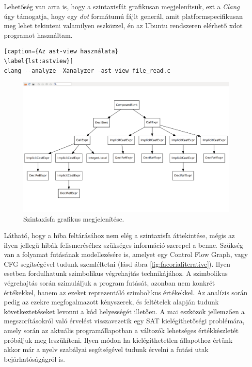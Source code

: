 \documentclass[a4paper,12pt]{report}
\begin{document}
Lehetőség van arra is, hogy a szintaxisfát grafikusan megjelenítsük, ezt a \emph{Clang} úgy támogatja, hogy egy \emph{dot} formátumú fájlt generál, amit platformspecifikusan meg lehet tekinteni valamilyen eszközzel, én az Ubuntu rendszeren elérhető xdot programot használtam.
\begin{lstlisting}[caption={Az ast-view használata}
\label{lst:astview}]
clang --analyze -Xanalyzer -ast-view file_read.c
\end{lstlisting}

\begin{figure}[h]
\caption{Szintaxisfa grafikus megjelenítése.}
\centering
\includegraphics[scale=0.2]{astview.png}
\end{figure}

Látható, hogy a hiba feltárásához nem elég a szintaxisfa áttekintése, mégis az ilyen jellegű hibák felismeréséhez szükséges információ szerepel a benne. Szükség van a folyamat futásának modellezésére is, amelyet egy Control Flow Graph, vagy CFG segítségével tudunk szemléltetni (lásd ábra \ref{fig:facorialiterative}). Ilyen esetben fordulhatunk szimbolikus végrehajtás technikájához. A szimbolikus végrehajtás során szimuláljuk a program futását, azonban nem konkrét értékekkel, hanem az ezeket reprezentáló szimbolikus értékekkel. Az analízis során pedig az ezekre megfogalmazott kényszerek, és feltételek alapján tudunk következtetéseket levonni a kód helyességét illetően. A mai eszközök jellemzően a megszorításokról való érvelést visszavezetik egy SAT kielégíthetőségi problémára, amely során az aktuális programállapotban a változók lehetséges értékkészletét próbáljuk meg leszűkíteni. Ilyen módon ha kielégíthetetlen állapothoz értünk akkor már a nyelv szabályai segítségével tudunk érvelni a futási utak bejárhatóságágról is.
\end{document}
